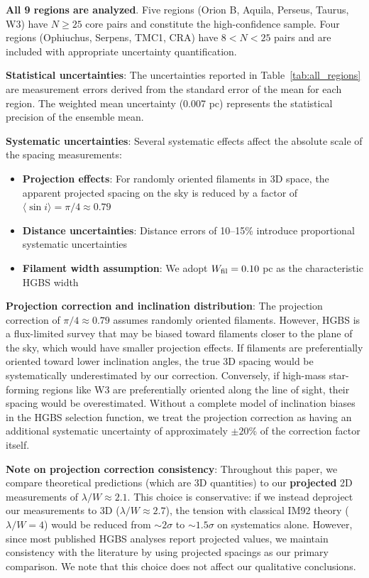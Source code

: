 \documentclass[11pt,a4paper]{article}
\begin{document}
\textbf{All 9 regions are analyzed}. Five regions (Orion B, Aquila, Perseus, Taurus, W3) have $N \geq 25$ core pairs and constitute the high-confidence sample. Four regions (Ophiuchus, Serpens, TMC1, CRA) have $8 < N < 25$ pairs and are included with appropriate uncertainty quantification.

\textbf{Statistical uncertainties}: The uncertainties reported in Table~\ref{tab:all_regions} are measurement errors derived from the standard error of the mean for each region. The weighted mean uncertainty (0.007 pc) represents the statistical precision of the ensemble mean.

\textbf{Systematic uncertainties}: Several systematic effects affect the absolute scale of the spacing measurements:
\begin{itemize}
    \item \textbf{Projection effects}: For randomly oriented filaments in 3D space, the apparent projected spacing on the sky is reduced by a factor of $\langle \sin i \rangle = \pi/4 \approx 0.79$
    \item \textbf{Distance uncertainties}: Distance errors of 10--15\% introduce proportional systematic uncertainties
    \item \textbf{Filament width assumption}: We adopt $W_{\rm fil} = 0.10$ pc as the characteristic HGBS width \citep{Arzoumanian2011}
\end{itemize}

\textbf{Projection correction and inclination distribution}: The projection correction of $\pi/4 \approx 0.79$ assumes randomly oriented filaments. However, HGBS is a flux-limited survey that may be biased toward filaments closer to the plane of the sky, which would have smaller projection effects. If filaments are preferentially oriented toward lower inclination angles, the true 3D spacing would be systematically underestimated by our correction. Conversely, if high-mass star-forming regions like W3 are preferentially oriented along the line of sight, their spacing would be overestimated. Without a complete model of inclination biases in the HGBS selection function, we treat the projection correction as having an additional systematic uncertainty of approximately $\pm20$\% of the correction factor itself.

\textbf{Note on projection correction consistency}: Throughout this paper, we compare theoretical predictions (which are 3D quantities) to our \textbf{projected} 2D measurements of $\lambda/W \approx 2.1$. This choice is conservative: if we instead deproject our measurements to 3D ($\lambda/W \approx 2.7$), the tension with classical IM92 theory ($\lambda/W = 4$) would be reduced from $\sim2\sigma$ to $\sim1.5\sigma$ on systematics alone. However, since most published HGBS analyses report projected values, we maintain consistency with the literature by using projected spacings as our primary comparison. We note that this choice does not affect our qualitative conclusions.
\end{document}
